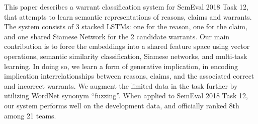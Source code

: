 This paper describes a warrant classification system for SemEval 2018  Task 12,  that attempts to learn semantic representations of reasons, claims and warrants. The system consists of 3 stacked LSTMs: one for the reason, one for the claim, and one shared Siamese Network for the 2 candidate warrants. Our main contribution is to force the embeddings into a shared feature space using vector operations, semantic similarity classification, Siamese networks, and multi-task learning. In doing so, we learn a form of generative implication, in encoding implication interrelationships between reasons, claims, and the associated correct and incorrect warrants. We augment the limited data in the task further by utilizing WordNet synonym ``fuzzing''. When applied to SemEval 2018 Task 12, our system performs well on the development data, and officially ranked 8th among 21 teams.
